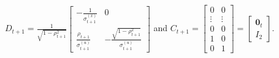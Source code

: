 $D_{t+1} =  \frac{1}{\sqrt{ 1-\rho_{t+1}^2} }\begin{bmatrix}
-\frac{1}{\sigma_{t+1}^{(x)}} & 0 \\
\frac{\rho_{t+1}}{\sigma_{t+1}^{(u)}} & -\frac{\sqrt{1-\rho_{t+1}^2}}{\sigma_{t+1}^{(u)}}
\end{bmatrix}$ and $C_{t+1} = \begin{bmatrix} 0 & 0 \\ \vdots & \vdots \\ 0 & 0 \\ 1 & 0 \\ 0 & 1 \end{bmatrix} = \begin{bmatrix}
\mathbf{0}_t \\ I_{2} \end{bmatrix}$. 


